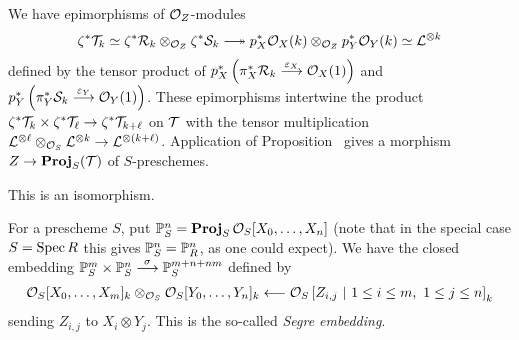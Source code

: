 \documentclass[a4paper,parskip=half,numbers=enddot, DIV=12]{scrreprt}
\begin{document}
We have epimorphisms of $\mathcal{O}_Z$-modules
\begin{align*}
	\zeta^*\Tt_k\simeq \zeta^*\Rr_k\otimes_{\Oo_Z}\zeta^*\Ss_k\epimorphism p_X^*\Oo_X(k)\otimes_{\Oo_Z}p_Y^*\Oo_Y(k)\simeq\Ll^{\otimes k}
\end{align*}
defined by the tensor product of $p_X^*\left(\pi_X^*\Rr_k\morphism[\epsilon_X]\Oo_X(1)\right)$ and $p_Y^*\left(\pi_Y^*\Ss_k\morphism[\epsilon_Y]\Oo_Y(1)\right)$. These epimorphisms intertwine the product $\zeta^*\Tt_k\times \zeta^*\Tt_\ell\morphism \zeta^*\Tt_{k+\ell}$ on $\mathcal{T}$ with the tensor multiplication $\Ll^{\otimes \ell}\otimes_{\Oo_S}\Ll^{\otimes k}\morphism\Ll^{\otimes(k+\ell)}$. Application of Proposition~ gives a morphism $Z\morphism\PROJ_S(\Tt)$ of $S$-preschemes. 
\begin{prop}
	This is an isomorphism.
\end{prop}
\begin{example}
	For a prescheme $S$, put $\mathbb{P}_S^n=\operatorname{\mathbf{Proj}}_S\mathcal{O}_S[X_0,\ldots,X_n]$ (note that in the special case $S=\operatorname{Spec} R$ this gives $\mathbb{P}_S^n=\mathbb{P}_R^n$, as one could expect). We have the closed embedding $\IP_S^m\times\IP_S^n\morphism[\sigma]\IP_S^{m+n+nm}$ defined by 
	\begin{align*}
		\Oo_S[X_0,\ldots,X_m]_k\otimes_{\Oo_S}\Oo_S[Y_0,\ldots,Y_n]_k\lmorphism \Oo_S\left[Z_{i,j}\st 1\leq i\leq m,\ 1\leq j\leq n\right]_k
	\end{align*}
	sending $Z_{i,j}$ to $X_i\otimes Y_j$. This is the so-called \emph{Segre embedding}.
\end{example}
\end{document}
